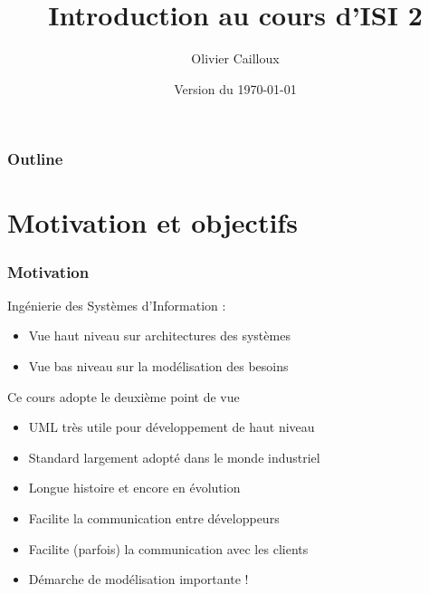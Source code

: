 \documentclass[french]{beamer}
\title{Introduction au cours d’ISI 2}
\author{Olivier Cailloux}
\institute[LAMSADE]{LAMSADE, Université Paris-Dauphine}
\date{Version du \today}
\begin{document}
\begin{frame}[plain]
	\titlepage
\end{frame}
\addtocounter{framenumber}{-1}

\begin{frame}
	\frametitle{Outline}
	\tableofcontents[hideallsubsections, sectionstyle=shaded/show]
\end{frame}

\section{Motivation et objectifs}
\begin{frame}
	\frametitle{Motivation}
	Ingénierie des Systèmes d’Information : 
	\begin{itemize}
		\item Vue haut niveau sur architectures des systèmes 
		\item Vue bas niveau sur la modélisation des besoins
	\end{itemize}
	Ce cours adopte le deuxième point de vue
	\begin{itemize}
		\item UML très utile pour développement de haut niveau
		\item Standard largement adopté dans le monde industriel
		\item Longue histoire et encore en évolution
		\item Facilite la communication entre développeurs
		\item Facilite (parfois) la communication avec les clients
		\item Démarche de modélisation importante !
	\end{itemize}
\end{frame}
\end{document}
